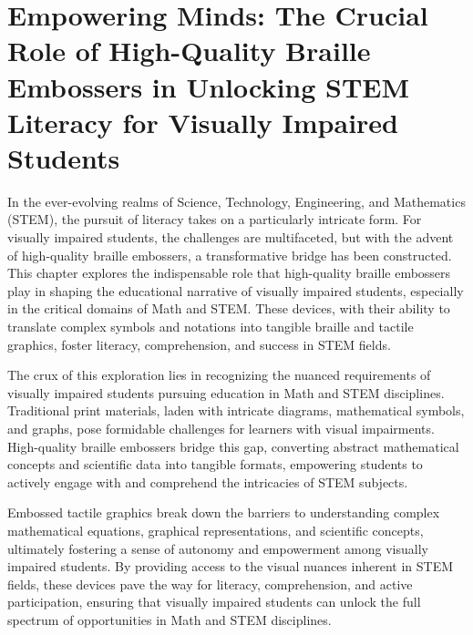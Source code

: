 \chapter{Empowering Minds: The Crucial Role of High-Quality Braille Embossers in Unlocking STEM Literacy for Visually Impaired Students}\label{generation}

In the ever-evolving realms of Science, Technology, Engineering, and Mathematics (STEM), the pursuit of literacy takes on a particularly intricate form. For visually impaired students, the challenges are multifaceted, but with the advent of high-quality braille embossers, a transformative bridge has been constructed. This chapter explores the indispensable role that high-quality braille embossers play in shaping the educational narrative of visually impaired students, especially in the critical domains of Math and STEM. These devices, with their ability to translate complex symbols and notations into tangible braille and tactile graphics, foster literacy, comprehension, and success in STEM fields.

The crux of this exploration lies in recognizing the nuanced requirements of visually impaired students pursuing education in Math and STEM disciplines. Traditional print materials, laden with intricate diagrams, mathematical symbols, and graphs, pose formidable challenges for learners with visual impairments. High-quality braille embossers bridge this gap, converting abstract mathematical concepts and scientific data into tangible formats, empowering students to actively engage with and comprehend the intricacies of STEM subjects.

Embossed tactile graphics break down the barriers to understanding complex mathematical equations, graphical representations, and scientific concepts, ultimately fostering a sense of autonomy and empowerment among visually impaired students. By providing access to the visual nuances inherent in STEM fields, these devices pave the way for literacy, comprehension, and active participation, ensuring that visually impaired students can unlock the full spectrum of opportunities in Math and STEM disciplines.

